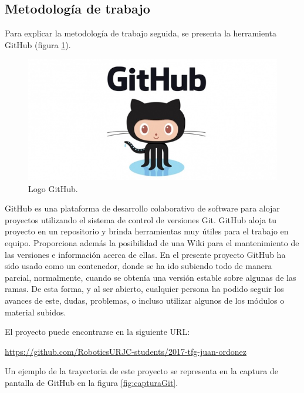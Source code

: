\subsection{Metodología de trabajo}
Para explicar la metodología de trabajo seguida, se presenta la herramienta GitHub (figura \ref{fig:github}).\newline 

\begin{figure}[H]
	\center
	\includegraphics[trim = 0mm 0mm 0mm 0mm, clip,scale=0.4]{imagenes/Introduction/github}
	\caption{Logo GitHub.}
	\label{fig:github}
\end{figure}


GitHub es una plataforma de desarrollo colaborativo de software para alojar proyectos utilizando el sistema de control de versiones Git. GitHub aloja tu proyecto en un repositorio y brinda herramientas muy útiles para el trabajo en equipo. \newline
Proporciona además la posibilidad de una Wiki para el mantenimiento de las versiones e información acerca de ellas. \newline
En el presente proyecto GitHub ha sido usado como un contenedor, donde se ha ido subiendo todo de manera parcial, normalmente, cuando se obtenía una versión estable sobre algunas de las ramas. \newline
De esta forma, y al ser abierto, cualquier persona ha podido seguir los avances de este, dudas, problemas, o incluso utilizar algunos de los módulos o material subidos. \newline
 
El proyecto puede encontrarse en la siguiente URL: \newline

\hyperref[]{https://github.com/RoboticsURJC-students/2017-tfg-juan-ordonez}

Un ejemplo de la trayectoria de este proyecto se representa en la captura de pantalla de GitHub en la figura \ref{fig:capturaGit}.

